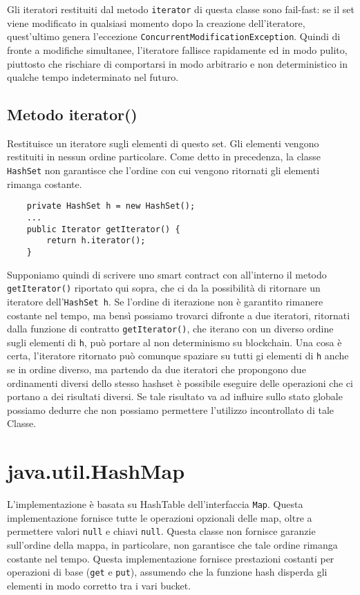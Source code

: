 		Gli iteratori restituiti dal metodo \lstinline|iterator| di questa classe sono fail-fast: se il set viene modificato in qualsiasi momento dopo la creazione dell'iteratore, quest'ultimo genera l'eccezione \lstinline|ConcurrentModificationException|. Quindi di fronte a modifiche simultanee, l'iteratore fallisce rapidamente ed in modo pulito, piuttosto che rischiare di comportarsi in modo arbitrario e non deterministico in qualche tempo indeterminato nel futuro.
		
		\subsection{Metodo iterator()}
			Restituisce un iteratore sugli elementi di questo set. Gli elementi vengono restituiti in nessun ordine particolare. Come detto in precedenza, la classe \lstinline|HashSet| non garantisce che l'ordine con cui vengono ritornati gli elementi rimanga costante.
			\begin{lstlisting}
	private HashSet h = new HashSet(); 
	...
	public Iterator getIterator() { 
		return h.iterator();
	}
			\end{lstlisting}
			Supponiamo quindi di scrivere uno smart contract con all'interno il metodo \lstinline|getIterator()| riportato qui sopra, che ci da la possibilità di ritornare un iteratore dell'\lstinline|HashSet h|. Se l'ordine di iterazione non è garantito rimanere costante nel tempo, ma bensì possiamo trovarci difronte a due iteratori, ritornati dalla funzione di contratto \lstinline|getIterator()|, che iterano con un diverso ordine sugli elementi di \lstinline|h|, può portare al non determinismo su blockchain. Una cosa è certa, l'iteratore ritornato può comunque spaziare su tutti gi elementi di \lstinline|h| anche se in ordine diverso, ma partendo da due iteratori che propongono due ordinamenti diversi dello stesso hashset è possibile eseguire delle operazioni che ci portano a dei risultati diversi. Se tale risultato va ad influire sullo stato globale possiamo dedurre che non possiamo permettere l'utilizzo incontrollato di tale Classe.
					
	\section{java.util.HashMap}
		L'implementazione è basata su HashTable dell'interfaccia \lstinline|Map|. Questa implementazione fornisce tutte le operazioni opzionali delle map, oltre a permettere valori \lstinline|null| e chiavi \lstinline|null|. Questa classe non fornisce garanzie sull'ordine della mappa, in particolare, non garantisce che tale ordine rimanga costante nel tempo. Questa implementazione fornisce prestazioni costanti per operazioni di base (\lstinline|get| e \lstinline|put|), assumendo che la funzione hash disperda gli elementi in modo corretto tra i vari bucket.
			
